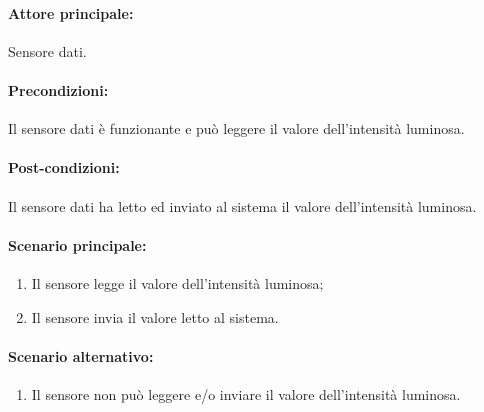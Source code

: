 \paragraph{Attore principale:}
Sensore dati.

\paragraph{Precondizioni:}
Il sensore dati è funzionante e può leggere il valore dell'intensità luminosa.

\paragraph{Post-condizioni:}
Il sensore dati ha letto ed inviato al sistema il valore dell'intensità luminosa.

\paragraph{Scenario principale:}
\begin{enumerate}
    \item Il sensore legge il valore dell'intensità luminosa;
    \item Il sensore invia il valore letto al sistema.
\end{enumerate}

\paragraph{Scenario alternativo:}
\begin{enumerate}
    \item Il sensore non può leggere e/o inviare il valore dell'intensità luminosa.
\end{enumerate}